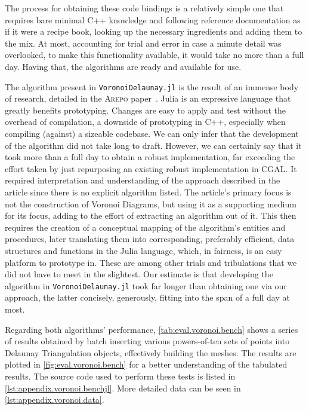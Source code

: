 The process for obtaining these code bindings is a relatively simple one that
requires bare minimal C++ knowledge and following reference documentation as if
it were a recipe book, looking up the necessary ingredients and adding them to
the mix.  At most, accounting for trial and error in case a minute detail was
overlooked, to make this functionality available, it would take no more than a
full day.  Having that, the algorithms are ready and available for use.

The algorithm present in \texttt{VoronoiDelaunay.jl} is the result of an immense
body of research, detailed in the \textsc{Arepo}
paper~\cite{Springel:2010:GCHSMM}.  Julia is an expressive language that greatly
benefits prototyping.  Changes are easy to apply and test without the overhead
of compilation, a downside of prototyping in C++, especially when compiling
(against) a sizeable codebase.  We can only infer that the development of the
algorithm did not take long to draft.  However, we can certainly say that it
took more than a full day to obtain a robust implementation, far exceeding the
effort taken by just repurposing an existing robust implementation in \ac{CGAL}.
It required interpretation and understanding of the approach described in the
article since there is no explicit algorithm listed.  The article's primary
focus is not the construction of Voronoi Diagrams, but using it as a supporting
medium for its focus, adding to the effort of extracting an algorithm out of it.
This then requires the creation of a conceptual mapping of the algorithm's
entities and procedures, later translating them into corresponding, preferably
efficient, data structures and functions in the Julia language, which, in
fairness, is an easy platform to prototype in.  These are among other trials and
tribulations that we did not have to meet in the slightest.  Our estimate is
that developing the algorithm in \texttt{VoronoiDelaunay.jl} took far longer
than obtaining one via our approach, the latter concisely, generously, fitting
into the span of a full day at most.

Regarding both algorithms' performance, \cref{tab:eval.voronoi.bench} shows a
series of results obtained by batch inserting various powers-of-ten sets of
points into Delaunay Triangulation objects, effectively building the meshes.
The results are plotted in \cref{fig:eval.voronoi.bench} for a better
understanding of the tabulated results.  The source code used to perform these
tests is listed in \cref{lst:appendix.voronoi.benchjl}.  More detailed data can
be seen in \cref{lst:appendix.voronoi.data}.

